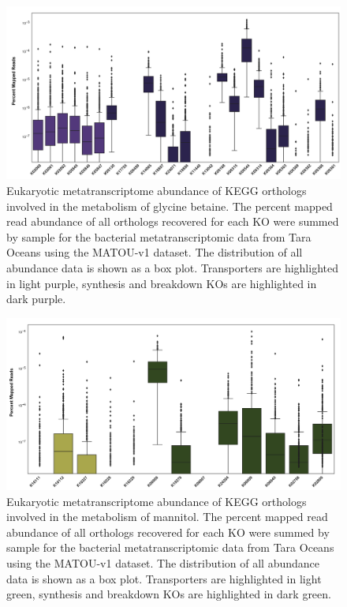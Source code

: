 \documentclass[utf8]{frontiers_suppmat} %
\begin{document}
\begin{figure}[ht]
    \centering
    \includegraphics[width=0.9\columnwidth]{Figures/SI-Euk-Glycine_betaine_distributions-01.png}
    \caption{Eukaryotic metatranscriptome abundance of KEGG orthologs involved in the metabolism of glycine betaine.  The percent mapped read abundance of all orthologs recovered for each KO were summed by sample for the bacterial metatranscriptomic data from Tara Oceans using the MATOU-v1 dataset. The distribution of all abundance data is shown as a box plot. Transporters are highlighted in light purple, synthesis and breakdown KOs are highlighted in dark purple.}
    \label{fig:euk-GB}
\end{figure}

\begin{figure}[ht]
    \centering
    \includegraphics[width=0.9\columnwidth]{Figures/SI-Euk_Manitol_distributions-01.png}
    \caption{Eukaryotic metatranscriptome abundance of KEGG orthologs involved in the metabolism of mannitol.  The percent mapped read abundance of all orthologs recovered for each KO were summed by sample for the bacterial metatranscriptomic data from Tara Oceans using the MATOU-v1 dataset. The distribution of all abundance data is shown as a box plot. Transporters are highlighted in light green, synthesis and breakdown KOs are highlighted in dark green.}
    \label{fig:euk-Man}
\end{figure}
\end{document}
